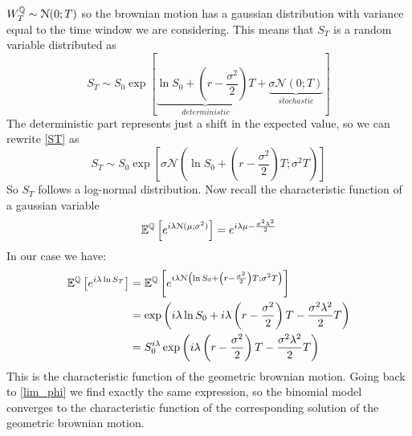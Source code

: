 $W_T^{\mathbb{Q}} \sim \mathcal{N}(0;T)$ so the brownian motion has a gaussian distribution with variance equal to the time window we are considering. This means that $S_T$ is a random variable distributed as 
\begin{equation}\label{ST}
    S_T\sim S_0\exp\left[\underbrace{\ln S_0+\left(r-\frac{\sigma^2}{2}\right)T}_{deterministic}+\underbrace{\sigma\mathcal{N}(0;T)}_{stochastic}\right]
\end{equation}
The deterministic part represents just a shift in the expected value, so we can rewrite \eqref{ST} as
\begin{equation}
    S_T\sim S_0\exp[\sigma\mathcal{N}\left(\ln S_0+\left(r-\frac{\sigma^2}{2}\right)T;\sigma^2 T\right)]
\end{equation}
So $S_T$ follows a log-normal distribution. Now recall the characteristic function of a gaussian variable
\begin{equation}
    \mathbb{E}^{\mathbb{Q}}\left[e^{i\lambda\mathcal{N}(\mu;\sigma^2)}\right] = e^{i\lambda\mu-\frac{\sigma^2\lambda^2}{2}}
\end{equation}
In our case we have:
\begin{align}
    \mathbb{E}^{\mathbb{Q}}\left[e^{i\lambda\ln S_T}\right] 
    &=
    \mathbb{E}^{\mathbb{Q}}\left[e^{i\lambda\mathcal{N}\left(\ln S_0+\left(r-\frac{\sigma^2}{2}\right)T;\sigma^2 T\right)}\right] \\
    &=
    \exp\left(i\lambda\ln S_0+i\lambda\left(r-\frac{\sigma^2}{2}\right)T-\dfrac{\sigma^2\lambda^2}{2}T\right) \\
    &=
    S_0^{i\lambda}\exp\left(i\lambda\left(r-\frac{\sigma^2}{2}\right)T-\dfrac{\sigma^2\lambda^2}{2}T\right)
\end{align}
This is the characteristic function of the geometric brownian motion. Going back to \eqref{lim_phi} we find exactly the same expression, so the binomial model converges to the characteristic function of the corresponding solution of the geometric brownian motion.